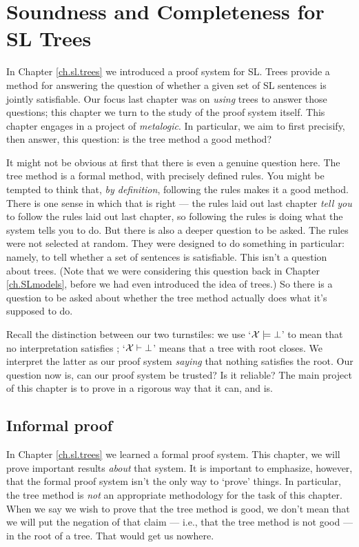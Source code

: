 \chapter{Soundness and Completeness for SL Trees}
\label{ch.SLsoundcomplete}

In Chapter \ref{ch.sl.trees} we introduced a proof system for SL. Trees provide a method for answering the question of whether a given set of SL sentences is jointly satisfiable. Our focus last chapter was on \emph{using} trees to answer those questions; this chapter we turn to the study of the proof system itself. This chapter engages in a project of \emph{metalogic}. In particular, we aim to first precisify, then answer, this question: is the tree method a good method?

It might not be obvious at first that there is even a genuine question here. The tree method is a formal method, with precisely defined rules. You might be tempted to think that, \emph{by definition}, following the rules makes it a good method. There is one sense in which that is right --- the rules laid out last chapter \emph{tell you} to follow the rules laid out last chapter, so following the rules is doing what the system tells you to do. But there is also a deeper question to be asked. The rules were not selected at random. They were designed to do something in particular: namely, to tell whether a set of sentences is satisfiable. This isn't a question about trees. (Note that we were considering this question back in Chapter \ref{ch.SLmodels}, before we had even introduced the idea of trees.) So there is a question to be asked about whether the tree method actually does what it's supposed to do.

Recall the distinction between our two turnstiles: we use `$\mathcal{X}{}\models{}\bot$' to mean that no interpretation satisfies \metaSetX{}; `$\mathcal{X}{}\vdash{}\bot$' means that a tree with root \metaSetX{} closes. We interpret the latter as our proof system \emph{saying} that nothing satisfies the root. Our question now is, can our proof system be trusted? Is it reliable? The main project of this chapter is to prove in a rigorous way that it can, and is.

\section{Informal proof}

In Chapter \ref{ch.sl.trees} we learned a formal proof system. This chapter, we will prove important results \emph{about} that system. It is important to emphasize, however, that the formal proof system isn't the only way to `prove' things. In particular, the tree method is \emph{not} an appropriate methodology for the task of this chapter. When we say we wish to prove that the tree method is good, we don't mean that we will put the negation of that claim --- i.e., that the tree method is not good --- in the root of a tree. That would get us nowhere.

